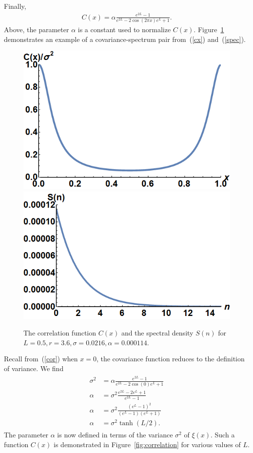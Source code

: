 Finally,
\begin{align}\label{cx}
C(x)= \alpha \frac{e^{2L}-1}{e^{2L}-2\cos(2\pi x)e^L+1}.
\end{align}
Above, the parameter $\alpha$ is a constant used to normalize
$C(x)$. Figure~\ref{fig:covspec} demonstrates an example of a covariance-spectrum
pair from~(\ref{cx}) and~(\ref{spec}). 
\begin{figure}[htp]
\caption[Schematic example of the covariance-spectrum pair]{The correlation function
  $C(x)$ and the spectral density $S(n)$ for $L=0.5,r=3.6,\sigma=0.0216, \alpha=0.000114$.}\label{fig:covspec}
\centering
\includegraphics[width=.45\textwidth]{figs/cx.png}\hfill
\includegraphics[width=.45\textwidth]{figs/sn.png}
\end{figure}
Recall from~(\ref{cor}) when $x=0$, the covariance function reduces to the definition
of variance. We find
\begin{align}
\begin{split}\label{a}
\sigma^2&= \alpha \frac{e^{2L}-1}{e^{2L}-2\cos(0)e^L+1}\\
\alpha &=\sigma^2 \frac{e^{2L}-2e^{L} +1}{e^{2L}-1}\\
\alpha &=\sigma^2
\frac{(e^{L}-1)^2}{(e^{L}-1)(e^{L}+1)}\\
\alpha &= \sigma^2 \tanh(L/2).
\end{split}
\end{align}
The parameter $\alpha$ is now defined in terms of the variance
$\sigma^2$ of $\xi(x)$. Such a function $C(x)$ is demonstrated in Figure~\ref{fig:correlation}
for various values of $L$.
